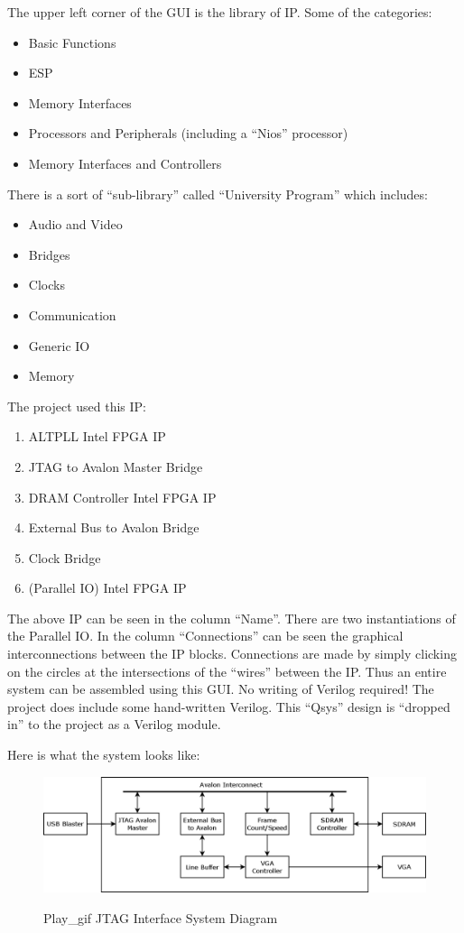The upper left corner of the GUI is the library of IP.  Some of the categories:

\begin{itemize}
	\item Basic Functions
\item ESP
\item Memory Interfaces
\item Processors and Peripherals (including a ``Nios'' processor)
\item Memory Interfaces and Controllers
\end{itemize}

There is a sort of ``sub-library'' called  ``University Program'' which includes:

\begin{itemize}
	\item Audio and Video
\item Bridges
\item Clocks
\item Communication
\item Generic IO
\item Memory
\end{itemize}

The project used this IP:

\begin{enumerate}
\item ALTPLL Intel FPGA IP
\item JTAG to Avalon Master Bridge
\item DRAM Controller Intel FPGA IP
\item External Bus to Avalon Bridge
\item Clock Bridge
\item (Parallel IO) Intel FPGA IP
\end{enumerate}

The above IP can be seen in the column ``Name''.  There are two instantiations of the Parallel IO.
In the column ``Connections'' can be seen the graphical interconnections between the IP blocks.
Connections are made by simply clicking on the circles at the intersections of the ``wires'' between the IP.
Thus an entire system can be assembled using this GUI.  No writing of Verilog required!
The project does include some hand-written Verilog.  This ``Qsys'' design is ``dropped in'' to the project
as a Verilog module.

Here is what the system looks like:

\begin{figure}[h]
	\centering
	\includegraphics[width=1.0\textwidth]{images/play_gif.png}
	\centering\bfseries
	\caption{Play\_gif JTAG Interface System Diagram}
\end{figure}

